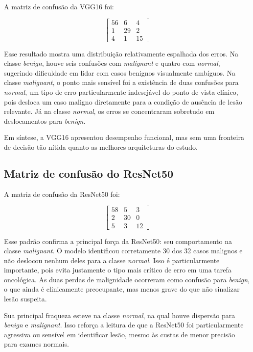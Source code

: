 \documentclass[tcc,capa]{texufpel}
\begin{document}
A matriz de confusão da VGG16 foi:

\[
\begin{bmatrix}
	56 & 6 & 4 \\
	1 & 29 & 2 \\
	4 & 1 & 15
\end{bmatrix}
\]

Esse resultado mostra uma distribuição relativamente espalhada dos erros. Na classe \textit{benign}, houve seis confusões com \textit{malignant} e quatro com \textit{normal}, sugerindo dificuldade em lidar com casos benignos visualmente ambíguos. Na classe \textit{malignant}, o ponto mais sensível foi a existência de duas confusões para \textit{normal}, um tipo de erro particularmente indesejável do ponto de vista clínico, pois desloca um caso maligno diretamente para a condição de ausência de lesão relevante. Já na classe \textit{normal}, os erros se concentraram sobretudo em deslocamentos para \textit{benign}.

Em síntese, a VGG16 apresentou desempenho funcional, mas sem uma fronteira de decisão tão nítida quanto as melhores arquiteturas do estudo.

\subsection{Matriz de confusão do ResNet50}

A matriz de confusão da ResNet50 foi:

\[
\begin{bmatrix}
	58 & 5 & 3 \\
	2 & 30 & 0 \\
	5 & 3 & 12
\end{bmatrix}
\]

Esse padrão confirma a principal força da ResNet50: seu comportamento na classe \textit{malignant}. O modelo identificou corretamente 30 dos 32 casos malignos e não deslocou nenhum deles para a classe \textit{normal}. Isso é particularmente importante, pois evita justamente o tipo mais crítico de erro em uma tarefa oncológica. As duas perdas de malignidade ocorreram como confusão para \textit{benign}, o que ainda é clinicamente preocupante, mas menos grave do que não sinalizar lesão suspeita.

Sua principal fraqueza esteve na classe \textit{normal}, na qual houve dispersão para \textit{benign} e \textit{malignant}. Isso reforça a leitura de que a ResNet50 foi particularmente agressiva ou sensível em identificar lesão, mesmo às custas de menor precisão para exames normais.
\end{document}
